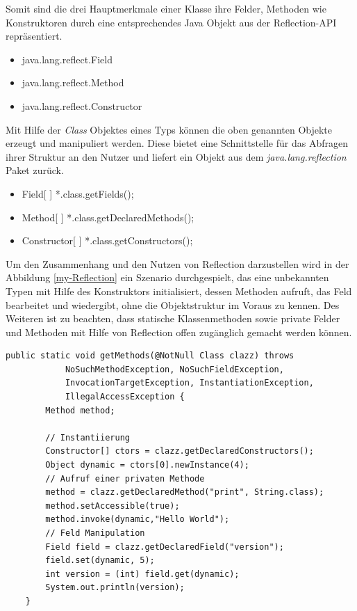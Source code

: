 \newpage
Somit sind die drei Hauptmerkmale einer Klasse ihre Felder, Methoden wie Konstruktoren durch eine entsprechendes Java Objekt aus der Reflection-API repräsentiert. 
\begin{itemize}
  \item java.lang.reflect.Field
  \item java.lang.reflect.Method
  \item java.lang.reflect.Constructor
\end{itemize}
Mit Hilfe der \textit{Class} Objektes eines Typs können die oben genannten Objekte erzeugt und manipuliert werden. Diese bietet eine Schnittstelle für das Abfragen ihrer Struktur an den Nutzer und liefert ein Objekt aus dem \textit{java.lang.reflection} Paket zurück.
\begin{itemize}
  \item Field[ ] *.class.getFields();
  \item Method[ ] *.class.getDeclaredMethods();
  \item Constructor[ ] *.class.getConstructors();
\end{itemize}

\bigbreak
Um den Zusammenhang und den Nutzen von Reflection darzustellen wird in der Abbildung \ref{my-Reflection} ein Szenario durchgespielt, das eine unbekannten Typen mit Hilfe des Konstruktors initialisiert, dessen Methoden aufruft, das Feld bearbeitet und wiedergibt, ohne die Objektstruktur im Voraus zu kennen. 
Des Weiteren ist zu beachten, dass statische Klassenmethoden sowie private Felder und Methoden mit Hilfe von Reflection offen zugänglich gemacht werden können.
\bigbreak 
\begin{lstlisting}[caption=Reflection in Aktion,label=my-Reflection,captionpos=b]
    public static void getMethods(@NotNull Class clazz) throws
            NoSuchMethodException, NoSuchFieldException,
            InvocationTargetException, InstantiationException,
            IllegalAccessException {
        Method method;

        // Instantiierung
        Constructor[] ctors = clazz.getDeclaredConstructors();
        Object dynamic = ctors[0].newInstance(4);
        // Aufruf einer privaten Methode
        method = clazz.getDeclaredMethod("print", String.class);
        method.setAccessible(true);
        method.invoke(dynamic,"Hello World");
        // Feld Manipulation
        Field field = clazz.getDeclaredField("version");
        field.set(dynamic, 5);
        int version = (int) field.get(dynamic);
        System.out.println(version);
    }
\end{lstlisting}

